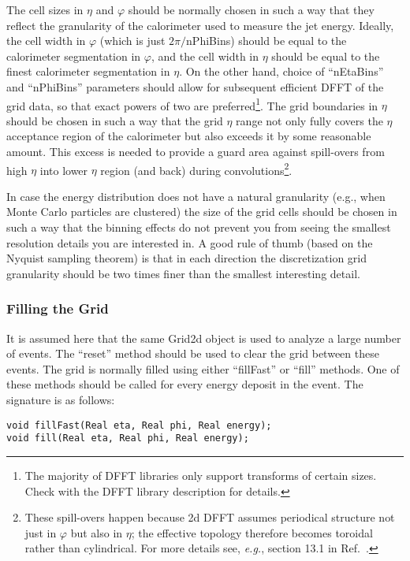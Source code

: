 \documentclass[epsf,12pt,titlepage]{article}
\newcommand{\cname}[1]{\index{#1}\textsf{#1}}
\begin{document}
The cell sizes in $\eta$ and $\varphi$ should be normally chosen
in such a way that they reflect the granularity of the calorimeter used to
measure the jet energy. Ideally, the cell width in $\varphi$ (which is just $2 \pi/$nPhiBins) should be equal to the
calorimeter segmentation in $\varphi$, and the cell width in $\eta$
should be equal to the finest calorimeter segmentation in $\eta$.
On the other hand, choice of ``nEtaBins'' and ``nPhiBins'' parameters
should allow for subsequent efficient DFFT of the grid data, so that
exact powers of two are preferred\footnote{The majority of DFFT libraries only
support transforms of certain sizes. Check with the DFFT library description
for details.}. The grid boundaries in $\eta$ should be chosen in such a way
that the grid $\eta$ range not only fully covers the $\eta$ acceptance
region of the calorimeter but also exceeds it by some reasonable
amount. This excess
is needed to provide a guard area against spill-overs from high $\eta$ into
lower $\eta$ region (and back) during convolutions\footnote{These spill-overs 
happen because 2d DFFT assumes periodical structure not just
in $\varphi$ but also in $\eta$; the effective topology
therefore becomes toroidal rather than cylindrical. For more details
see, {\it e.g.}, section 13.1 in Ref.~\cite{ref:numrecipes}.}.

In case the energy distribution does not have a natural granularity
(e.g., when Monte Carlo particles are clustered)
the size of the grid cells should be chosen in such a way that
the binning effects do not prevent you from seeing the smallest
resolution details you are interested in. A good rule of thumb
(based on the Nyquist sampling theorem) is that in each direction
the discretization
grid granularity
should be two times finer than the smallest
interesting detail.

\subsubsection{Filling the Grid}

It is assumed here that the same \cname{Grid2d} object is
used to analyze a large number of events.
The ``reset'' method should be used to clear the grid
between these events.
The grid is normally filled using either ``fillFast'' or ``fill''
methods. One of these methods should be called for every
energy deposit in the event. The signature is as follows:
\begin{verbatim}
void fillFast(Real eta, Real phi, Real energy);
void fill(Real eta, Real phi, Real energy);
\end{verbatim}
\end{document}
